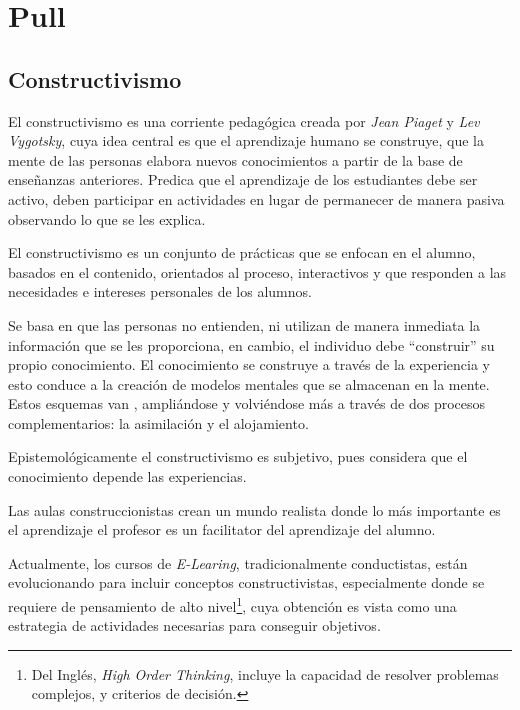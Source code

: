 \section{Pull}

\subsection{Constructivismo}

El constructivismo es una corriente pedagógica creada por \textit{Jean Piaget} y
\textit{Lev Vygotsky}, cuya idea central es que el aprendizaje humano se
construye, que la mente de las personas elabora nuevos conocimientos a partir de
la base de enseñanzas anteriores\cite{martin2008modelo}. Predica que el
aprendizaje de los estudiantes debe ser activo, deben participar en actividades
en lugar de permanecer de manera pasiva observando lo que se les
explica\cite{hernandez:constructivismo,johnson2005instructionism}.

El constructivismo es un conjunto de prácticas que se enfocan en el alumno,
basados en el contenido, orientados al proceso, interactivos y que responden a
las necesidades e intereses personales de los
alumnos\cite{johnson2005instructionism}.

Se basa en que las personas no entienden, ni utilizan de manera inmediata la
información que se les proporciona, en cambio, el individuo debe
\enquote{construir} su propio conocimiento. El conocimiento se construye a
través de la experiencia y esto conduce a la creación de modelos mentales que
se almacenan en la mente. Estos esquemas van , ampliándose y
volviéndose más  a través de dos procesos
complementarios: la asimilación y el
alojamiento\cite{hernandez:constructivismo,johnson2005instructionism}.

Epistemológicamente el constructivismo es subjetivo, pues considera que el
conocimiento depende las experiencias\cite{johnson2005instructionism}. 

Las aulas construccionistas crean un mundo realista donde lo más importante es
el aprendizaje el profesor es un facilitator del aprendizaje del
alumno\cite{johnson2005instructionism,nanjappa2003constructing}.

Actualmente, los cursos de \textit{E-Learing}, tradicionalmente conductistas,
están evolucionando para incluir conceptos
constructivistas\cite{weegar2012comparison}, especialmente donde se requiere de
pensamiento de alto nivel\footnote{Del Inglés, \textit{High Order Thinking},
    incluye la capacidad de resolver problemas complejos, y criterios de
    decisión.}, cuya obtención es vista como una estrategia de actividades
necesarias para conseguir objetivos\cite{miri2007purposely}.

